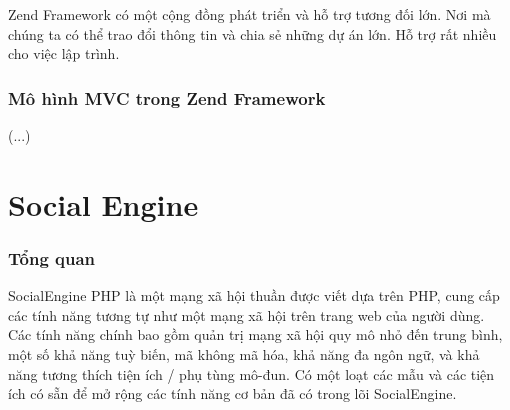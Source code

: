 Zend Framework có một cộng đồng phát triển và hỗ trợ tương đối lớn. Nơi mà chúng ta có thể trao đổi thông tin và chia sẻ những dự án lớn. Hỗ trợ rất nhiều cho việc lập trình.

\subsubsection{Mô hình MVC trong Zend Framework}
(...)

\section{Social Engine}
\subsubsection{Tổng quan}
SocialEngine PHP là một mạng xã hội thuần được viết dựa trên PHP, cung cấp các tính năng tương tự như một mạng xã hội trên trang web của người dùng. Các tính năng chính bao gồm quản trị mạng xã hội quy mô nhỏ đến trung bình, một số khả năng tuỳ biến, mã không mã hóa, khả năng đa ngôn ngữ, và khả năng tương thích tiện ích / phụ tùng mô-đun. Có một loạt các mẫu và các tiện ích có sẵn để mở rộng các tính năng cơ bản đã có trong lõi SocialEngine.

